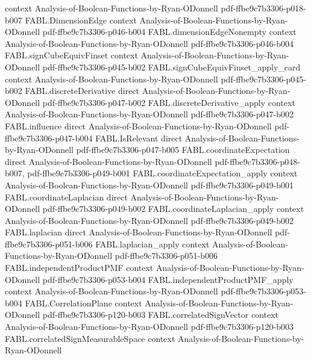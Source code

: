 \begin{theorem}
  {context}
  {Analysis-of-Boolean-Functions-by-Ryan-ODonnell}
  {pdf-ffbe9c7b3306-p018-b007}
\proofstep
  {FABL.DimensionEdge}
  {context}
  {Analysis-of-Boolean-Functions-by-Ryan-ODonnell}
  {pdf-ffbe9c7b3306-p046-b004}
\proofstep
  {FABL.dimensionEdgeNonempty}
  {context}
  {Analysis-of-Boolean-Functions-by-Ryan-ODonnell}
  {pdf-ffbe9c7b3306-p046-b004}
\proofstep
  {FABL.signCubeEquivFinset}
  {context}
  {Analysis-of-Boolean-Functions-by-Ryan-ODonnell}
  {pdf-ffbe9c7b3306-p045-b002}
\proofstep
  {FABL.signCubeEquivFinset_apply_card}
  {context}
  {Analysis-of-Boolean-Functions-by-Ryan-ODonnell}
  {pdf-ffbe9c7b3306-p045-b002}
\proofstep
  {FABL.discreteDerivative}
  {direct}
  {Analysis-of-Boolean-Functions-by-Ryan-ODonnell}
  {pdf-ffbe9c7b3306-p047-b002}
\proofstep
  {FABL.discreteDerivative_apply}
  {context}
  {Analysis-of-Boolean-Functions-by-Ryan-ODonnell}
  {pdf-ffbe9c7b3306-p047-b002}
\proofstep
  {FABL.influence}
  {direct}
  {Analysis-of-Boolean-Functions-by-Ryan-ODonnell}
  {pdf-ffbe9c7b3306-p047-b004}
\proofstep
  {FABL.IsRelevant}
  {direct}
  {Analysis-of-Boolean-Functions-by-Ryan-ODonnell}
  {pdf-ffbe9c7b3306-p047-b005}
\proofstep
  {FABL.coordinateExpectation}
  {direct}
  {Analysis-of-Boolean-Functions-by-Ryan-ODonnell}
  {pdf-ffbe9c7b3306-p048-b007,
    pdf-ffbe9c7b3306-p049-b001}
\proofstep
  {FABL.coordinateExpectation_apply}
  {context}
  {Analysis-of-Boolean-Functions-by-Ryan-ODonnell}
  {pdf-ffbe9c7b3306-p049-b001}
\proofstep
  {FABL.coordinateLaplacian}
  {direct}
  {Analysis-of-Boolean-Functions-by-Ryan-ODonnell}
  {pdf-ffbe9c7b3306-p049-b002}
\proofstep
  {FABL.coordinateLaplacian_apply}
  {context}
  {Analysis-of-Boolean-Functions-by-Ryan-ODonnell}
  {pdf-ffbe9c7b3306-p049-b002}
\proofstep
  {FABL.laplacian}
  {direct}
  {Analysis-of-Boolean-Functions-by-Ryan-ODonnell}
  {pdf-ffbe9c7b3306-p051-b006}
\proofstep
  {FABL.laplacian_apply}
  {context}
  {Analysis-of-Boolean-Functions-by-Ryan-ODonnell}
  {pdf-ffbe9c7b3306-p051-b006}
\proofstep
  {FABL.independentProductPMF}
  {context}
  {Analysis-of-Boolean-Functions-by-Ryan-ODonnell}
  {pdf-ffbe9c7b3306-p053-b004}
\proofstep
  {FABL.independentProductPMF_apply}
  {context}
  {Analysis-of-Boolean-Functions-by-Ryan-ODonnell}
  {pdf-ffbe9c7b3306-p053-b004}
\proofstep
  {FABL.CorrelationPlane}
  {context}
  {Analysis-of-Boolean-Functions-by-Ryan-ODonnell}
  {pdf-ffbe9c7b3306-p120-b003}
\proofstep
  {FABL.correlatedSignVector}
  {context}
  {Analysis-of-Boolean-Functions-by-Ryan-ODonnell}
  {pdf-ffbe9c7b3306-p120-b003}
\proofstep
  {FABL.correlatedSignMeasurableSpace}
  {context}
  {Analysis-of-Boolean-Functions-by-Ryan-ODonnell}

\end{theorem}
